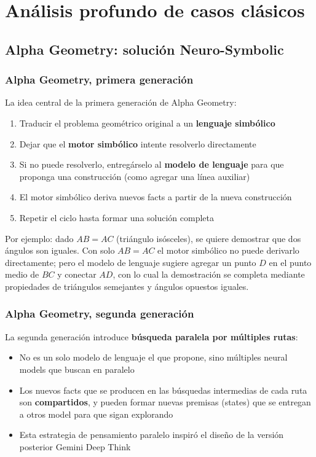 \section{Análisis profundo de casos clásicos}

\subsection{Alpha Geometry: solución Neuro-Symbolic}

\subsubsection{Alpha Geometry, primera generación}

La idea central de la primera generación de Alpha Geometry:
\begin{enumerate}
    \item Traducir el problema geométrico original a un \textbf{lenguaje simbólico}
    \item Dejar que el \textbf{motor simbólico} intente resolverlo directamente
    \item Si no puede resolverlo, entregárselo al \textbf{modelo de lenguaje} para que proponga una construcción (como agregar una línea auxiliar)
    \item El motor simbólico deriva nuevos facts a partir de la nueva construcción
    \item Repetir el ciclo hasta formar una solución completa
\end{enumerate}

Por ejemplo: dado $AB = AC$ (triángulo isósceles), se quiere demostrar que dos ángulos son iguales. Con solo $AB = AC$ el motor simbólico no puede derivarlo directamente; pero el modelo de lenguaje sugiere agregar un punto $D$ en el punto medio de $BC$ y conectar $AD$, con lo cual la demostración se completa mediante propiedades de triángulos semejantes y ángulos opuestos iguales.

\subsubsection{Alpha Geometry, segunda generación}

La segunda generación introduce \textbf{búsqueda paralela por múltiples rutas}:
\begin{itemize}
    \item No es un solo modelo de lenguaje el que propone, sino múltiples neural models que buscan en paralelo
    \item Los nuevos facts que se producen en las búsquedas intermedias de cada ruta son \textbf{compartidos}, y pueden formar nuevas premisas (states) que se entregan a otros model para que sigan explorando
    \item Esta estrategia de pensamiento paralelo inspiró el diseño de la versión posterior Gemini Deep Think
\end{itemize}

